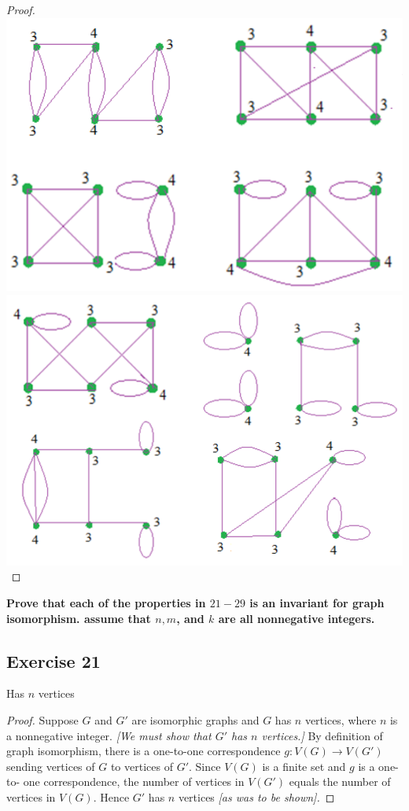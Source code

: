 \documentclass[14pt]{extarticle}
\newcommand{\cy}{\color{cyan}}
\begin{document}
\begin{proof}
    \includegraphics[scale=0.25]{../images/10.3.20.a.png}
    \includegraphics[scale=0.25]{../images/10.3.20.b.png}
\end{proof}

{\bf \cy Prove that each of the properties in \(21-29\) is an invariant for graph isomorphism. assume that \(n, m\), and
\(k\) are all nonnegative integers.}

\subsection{Exercise 21}
Has \(n\) vertices

\begin{proof}
    Suppose \(G\) and \(G'\) are isomorphic graphs and \(G\) has \(n\) vertices, where \(n\) is a nonnegative integer. {\it [We
                must show that \(G'\) has \(n\) vertices.]} By definition of graph isomorphism, there is a one-to-one correspondence \(g:
    V(G) \to V(G')\) sending vertices of \(G\) to vertices of \(G'\). Since \(V(G)\) is a finite set and \(g\) is a one-to-
    one correspondence, the number of vertices in \(V(G')\) equals the number of vertices in \(V(G)\). Hence \(G'\) has \(n\)
    vertices {\it [as was to be shown].}
\end{proof}
\end{document}

